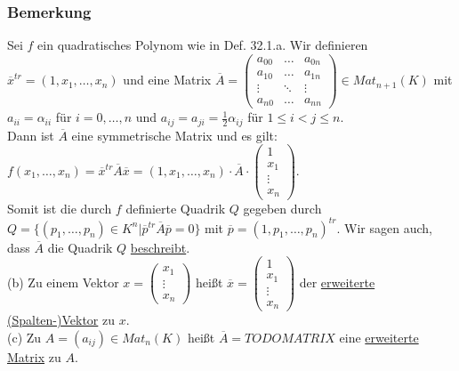 \documentclass[a4paper]{article}
\newcommand{\ul}{\underline}
\begin{document}
\subsubsection{Bemerkung}
Sei \(f\) ein quadratisches Polynom wie in Def. 32.1.a. Wir definieren \(\overline{x}^{tr}=(1,x_1,\dots,x_n)\) und eine Matrix \(\overline{A}=\begin{pmatrix}
a_{00} & \hdots & a_{0n}\\
a_{10} & \hdots & a_{1n}\\
\vdots & \ddots & \vdots\\
a_{n0} & \hdots & a_{nn}
\end{pmatrix}\in Mat_{n+1}(K)\) mit \(a_{ii}=\alpha_{ii}\) für \(i=0,\dots,n\) und \(a_{ij}=a_{ji}=\frac{1}{2}\alpha_{ij}\) für \(1\leq i< j\leq n\).\\
Dann ist \(\overline{A}\) eine symmetrische Matrix und es gilt: \(f(x_1,\dots,x_n)=\overline{x}^{tr}\overline{A}\overline{x}=(1,x_1,\dots,x_n)\cdot\overline{A}\cdot \begin{pmatrix}
1\\
x_1\\
\vdots\\
x_n
\end{pmatrix}\).\\
Somit ist die durch \(f\) definierte Quadrik \(Q\) gegeben durch \(Q=\{(p_1,\dots,p_n)\in K^n|\overline{p}^{tr}\overline{A}\overline{p}=0\}\) mit \(\overline{p}=(1,p_1,\dots,p_n)^{tr}\). Wir sagen auch, dass \(\overline{A}\) die Quadrik \(Q\) \ul{beschreibt}.\\
(b) Zu einem Vektor \(x=\begin{pmatrix}
x_1\\
\vdots\\
x_n
\end{pmatrix}\) heißt \(\overline{x}=\begin{pmatrix}
1\\
x_1\\
\vdots\\
x_n
\end{pmatrix}\) der \ul{erweiterte (Spalten-)Vektor} zu \(x\).\\
(c) Zu \(A=(a_{ij})\in Mat_n(K)\) heißt \(\overline{A}=TODO MATRIX\) eine \ul{erweiterte Matrix} zu \(A\).
\end{document}

